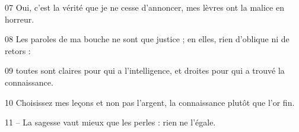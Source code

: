 
07 Oui, c’est la vérité que je ne cesse d’annoncer, mes lèvres ont la malice en horreur.

08 Les paroles de ma bouche ne sont que justice ; en elles, rien d’oblique ni de retors :

09 toutes sont claires pour qui a l’intelligence, et droites pour qui a trouvé la connaissance.

10 Choisissez mes leçons et non pas l’argent, la connaissance plutôt que l’or fin.

11 – La sagesse vaut mieux que les perles : rien ne l’égale.
